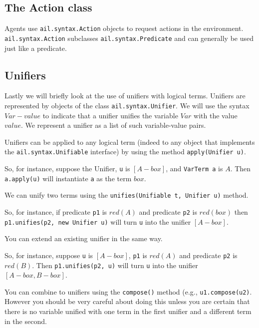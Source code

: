 \documentclass[a4]{article}
\begin{document}
\subsection{The Action class}
Agents use \texttt{ail.syntax.Action} objects to request actions in the environment.  \texttt{ail.syntax.Action} subclasses \texttt{ail.syntax.Predicate} and can generally be used just like a predicate.

\subsection{Unifiers}
Lastly we will briefly look at the use of unifiers with logical terms.  Unifiers are represented by objects of the class \texttt{ail.syntax.Unifier}.  We will use the syntax $Var-value$ to indicate that a unifier unifies the variable $Var$ with the value $value$.  We represent a unifier as a list of such variable-value pairs.
\begin{itemize}
\item Unifiers can be applied to any logical term (indeed to any object that implements the \texttt{ail.syntax.Unifiable} interface) by using the method \texttt{apply(Unifier u)}.

So, for instance, suppose the  Unifier, \texttt{u} is $[A-box]$, and \texttt{VarTerm a} is $A$. Then \texttt{a.apply(u)} will instantiate \texttt{a} as the term $box$.
\item We can unify two terms using the \texttt{unifies(Unifiable t, Unifier u)} method.

So, for instance, if predicate \texttt{p1} is $red(A)$ and predicate \texttt{p2} is $red(box)$ then \texttt{p1.unifies(p2, new Unifier u)} will turn \texttt{u} into the unifier $[A-box]$.
\item You can extend an existing unifier in the same way. 

So, for instance, suppose \texttt{u} is $[A-box]$, \texttt{p1} is $red(A)$ and predicate \texttt{p2} is $red(B)$.  Then \texttt{p1.unifies(p2, u)} will turn \texttt{u} into the unifier $[A-box, B-box]$.
\begin{sloppypar}
\item You can combine to unifiers using the \texttt{compose()} method (e.g., \texttt{u1.compose(u2)}.  However you should be very careful about doing this unless you are certain that there is no variable unified with one term in the first unifier and a different term in the second.
\end{sloppypar}
\end{itemize}
\end{document}
